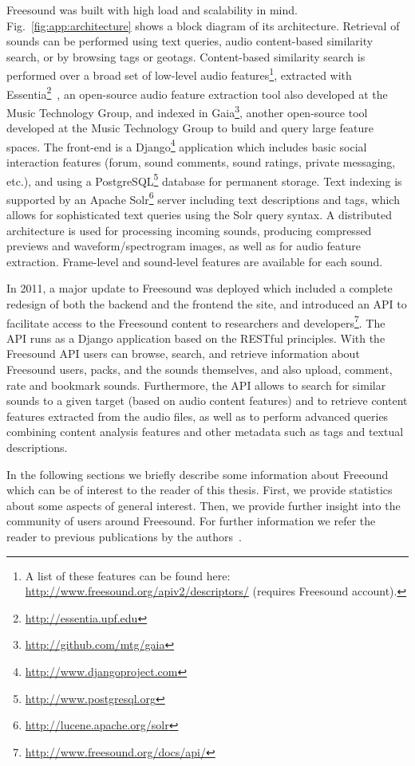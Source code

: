 Freesound was built with high load and scalability in mind. 
Fig.~\ref{fig:app:architecture} shows a block diagram of its architecture. 
Retrieval of sounds can be performed using text queries, audio content-based similarity search, or by browsing tags or geotags. 
Content-based similarity search is performed over a broad set of low-level audio features\footnote{A list of these features can be found here: \url{http://www.freesound.org/apiv2/descriptors/} (requires Freesound account).}, extracted with Essentia\footnote{\url{http://essentia.upf.edu}}~\citep{Bogdanov2013}, an open-source audio feature extraction tool also developed at the Music Technology Group, and indexed in Gaia\footnote{\url{http://github.com/mtg/gaia}}, another open-source tool developed at the Music Technology Group to build and query large feature spaces.
The front-end is a Django\footnote{\url{http://www.djangoproject.com}} application which includes basic social interaction features (forum, sound comments, sound ratings, private messaging, etc.), and using a PostgreSQL\footnote{\url{http://www.postgresql.org}} database for permanent storage.
Text indexing is supported by an Apache Solr\footnote{\url{http://lucene.apache.org/solr}} server including text descriptions and tags, which allows for sophisticated text queries using the Solr query syntax. 
A distributed architecture is used for processing incoming sounds, producing compressed previews and waveform/spectrogram images, as well as for audio feature extraction. Frame-level and sound-level features are available for each sound.

In 2011, a major update to Freesound was deployed which included a complete redesign of both the backend and the frontend the site, and introduced an API to facilitate access to the Freesound content to researchers and developers\footnote{\url{http://www.freesound.org/docs/api/}}. The API runs as a Django application based on the RESTful principles. 
With the Freesound API users can browse, search, and retrieve information about Freesound users, packs, and the sounds themselves, and also upload, comment, rate and bookmark sounds. 
Furthermore, the API allows to search for similar sounds to a given target (based on audio content features) and to retrieve content features extracted from the audio files, as well as to perform advanced queries combining content analysis features and other metadata such as tags and textual descriptions. 

In the following sections we briefly describe some information about Freeound which can be of interest to the reader of this thesis.
First, we provide statistics about some aspects of general interest. %
Then, we provide further insight into the community of users around Freesound. %
For further information we refer the reader to previous publications by the authors~\citep{Font2012,Font,Font2013b}.


